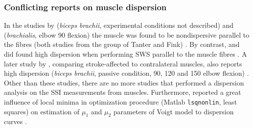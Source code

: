 \subsubsection{Conflicting reports on muscle dispersion}
In the studies by \citeauthor{deffieux_shear_2009} (\textit{biceps brachii}, experimental conditions not described) and \citeauthor{gennisson_viscoelastic_2010} (\textit{brachialis}, elbow \SI{90}{\deg} flexion) the muscle was found to be nondispersive parallel to the fibres (both studies from the group of Tanter and Fink) \cite{deffieux_shear_2009, gennisson_viscoelastic_2010}. By contrast, \citeauthor{rasool_altered_2016} and \citeauthor{saadat_frequency_2018} did found high dispersion when performing SWS parallel to the muscle fibres \cite{rasool_altered_2016, saadat_frequency_2018}. A later study by \citeauthor{rasool_shear_2018}, comparing stroke-affected to contralateral muscles, also reports high dispersion (\textit{biceps brachii}, passive condition, 90, 120 and 150 \si{\deg} elbow flexion) \cite{rasool_shear_2018}. Other than these studies, there are no more studies that performed a dispersion analysis on the SSI measurements from muscles. Furthermore, \citeauthor{rasool_shear_2018} reported a great influence of local minima in optimization procedure (Matlab \texttt{lsqnonlin}, least squares) on estimation of $\mu_1$ and $\mu_2$ parameters of Voigt model to dispersion curves \cite{rasool_shear_2018}. 




